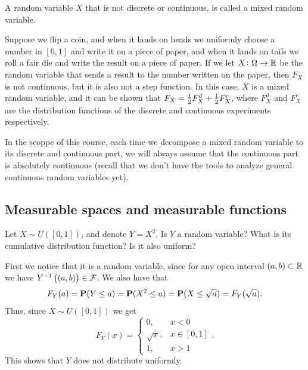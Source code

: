 \documentclass[11pt,a4paper]{article}
\begin{document}
\begin{definition}
  A random variable $X$ that is not discrete or continuous, is called
  a mixed random variable.
\end{definition}

\begin{example}
  Suppose we flip a coin,
  and when it lands on heads we uniformly choose a number in $[0,1]$
  and write it on a piece of paper,
  and when it lands on tails we roll a fair die and write the result
  on a piece of paper.
  If we let $X \colon \Omega \to \mathbb{R}$ be the random variable
  that sends a result to the number written on the paper,
  then $F_X$ is not continuous,
  but it is also not a step function.
  In this case, $X$ is a mixed random variable,
  and it can be shown that $F_X = \frac{1}{2} F_X^d + \frac{1}{2} F_X^c$,
  where $F_X^d$ and $F_X^c$ are the distribution functions
  of the discrete and continuous experiments respectively.
\end{example}

\begin{remark}
  In the scoppe of this course,
  each time we decompose a mixed random variable to its discrete and
  continuous part, we will always assume that the continuous
  part is absolutely continuous (recall that we don't have the tools
  to analyze general continuous random variables yet).
\end{remark}

\subsection{Measurable spaces and measurable functions}

\begin{example}
  \label{exmp:y-xx}
  Let $X \sim U([0,1])$, and denote $Y = X^2$.
  Is $Y$ a random variable?
  What is its cumulative distribution function?
  Is it also uniform?

  First we notice that it is a random variable,
  since for any open interval $(a,b) \subset \mathbb{R}$ we have
  $Y^{-1}\del{(a,b)} \in \mathcal F$.
  We also have that
  \[
    F_Y(a) =
    \mathbf{P}(Y \le a) =
    \mathbf{P}(X^2 \le a) =
    \mathbf{P}(X \le \sqrt a) =
    F_Y(\sqrt a).
  \]
  Thus, since $X \sim U([0,1])$ we get
  \[
    F_Y(x) =
    \begin{cases}
      0, &x < 0 \\
      \sqrt{x}, &x \in [0,1] \\
      1, &x > 1
    \end{cases}.
  \]
  This shows that $Y$ does not distribute uniformly.
\end{example}
\end{document}
